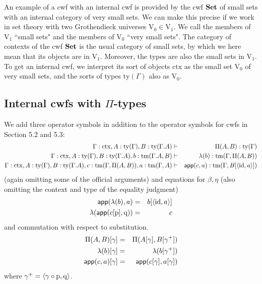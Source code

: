 \documentclass{lmcs}
\def\V{\mathrm{V}}
\def\id{\mathrm{id}}
\newcommand{\ctx}{\mathrm{ctx}}
\newcommand{\ty}{\mathrm{ty}}
\newcommand{\tm}{\mathrm{tm}}
\begin{document}
An example of a cwf with an internal cwf is provided by the cwf ${\bf Set}$ of small sets with an internal category of very small sets. We can make this precise if we work in set theory with two Grothendieck universes $\V_0 \in \V_1$. We call the members of $\V_1$ ``small sets" and the members of $\V_0$ ``very small sets". The category of contexts of the cwf ${\bf Set}$ is the usual category of small sets, by which we here mean that its objects are in $\V_1$. Moreover, the types are also the small sets in $\V_1$. To get an internal cwf, we interpret its sort of objects $\ctx$ as the small set $\V_0$ of very small sets, and the sorts of types $\ty(\Gamma)$ also as $\V_0$.


\subsection{Internal cwfs with $\Pi$-types}
We add three operator symbols in addition to the operator symbols for cwfs in Section 5.2 and 5.3:
\begin{eqnarray*}
\Gamma : \ctx, A : \ty(\Gamma), B : \ty(\Gamma.A)&\vdash& \Pi(A,B) : \ty(\Gamma)\\
\Gamma : \ctx, A : \ty(\Gamma), B : \ty(\Gamma.A), b : \tm(\Gamma.A, B) &\vdash& \lambda(b) : \tm(\Gamma,\Pi(A,B))\\
\Gamma : \ctx, A : \ty(\Gamma), B : \ty(\Gamma.A), c :  \tm(\Gamma,\Pi(A,B)), a : \tm(\Gamma, A) &\vdash& \app(c,a) : \tm(\Gamma, B[\tuple{\id,a}])
\end{eqnarray*}
(again omitting some of the official arguments)
and equations for $\beta, \eta$ (also omitting the context and type of the equality judgment)
 \begin{eqnarray*}
 \app(\lambda(b),a) &=& b[\tuple{\id,a}]\\
 \lambda(\app(c[\p],\q)) &=& c
\end{eqnarray*}
and commutation with respect to substitution.
\begin{eqnarray*}
\Pi(A,B)[ \gamma ] &=& \Pi(A [ \gamma ], B[ \gamma^+ ])\\
\lambda(b) [ \gamma ] &=& \lambda(b[\gamma^+ ])\\
\mathsf{app}(c,a) [ \gamma ] &=& \mathsf{app}(c[ \gamma ], a[ \gamma ] )
\end{eqnarray*}
where $\gamma^+ = \langle \gamma \circ \mathrm{p}, \mathrm{q} \rangle$.
\end{document}
